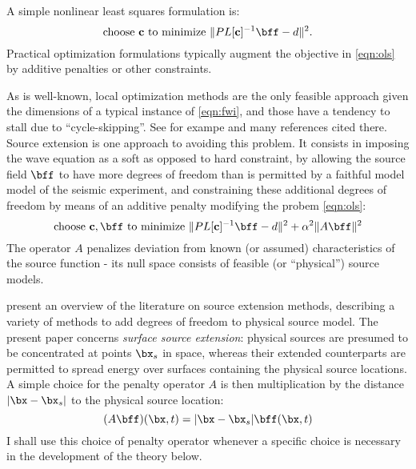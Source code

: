 A simple nonlinear least squares formulation is:
\begin{equation}
\label{eqn:ols}
\mbox{choose } {\bf c} \mbox{ to minimize } \|PL[{\bf c}]^{-1}\bff -d \|^2.
\end{equation}
Practical optimization formulations typically augment the objective in
\ref{eqn:ols} by additive penalties or other constraints.

As is well-known, local optimization methods are the only feasible
approach given the dimensions of a typical instance of \ref{eqn:fwi},
and those have a tendency to stall due to ``cycle-skipping''. See for
exampe \cite{VirieuxOperto:09} and many references cited there. Source
extension is one approach to avoiding this problem. It consists in
imposing the wave equation as a soft as opposed to hard constraint, by
allowing the source field $\bff$ to have more degrees of freedom than
is permitted by a faithful model model of the seismic experiment, and
constraining these additional degrees of freedom by means of an
additive penalty modifying the probem \ref{eqn:ols}:
\begin{equation}
\label{eqn:esi}
\mbox{choose } {\bf c}, \bff \mbox{ to minimize } \|PL[{\bf c}]^{-1}\bff -d \|^2 + \alpha^2 \|A\bff\|^2 
\end{equation}
The operator $A$ penalizes deviation from known (or assumed)
characteristics of the source function - its null space consists of
feasible (or ``physical'') source models.

\cite{HuangNammourSymesDollizal:SEG19} present an overview of the
literature on source extension methods, describing a variety of
methods to add degrees of freedom to physical source model. The present paper
concerns {\em surface source extension}: physical sources are
presumed to be concentrated at points $\bx_s$ in space, whereas their extended
counterparts are permitted to spread energy over surfaces containing
the physical source locations. A simple choice for the penalty
operator $A$ is then multiplication by the distance $|\bx-\bx_s|$ to the physical
source location:
\begin{equation}
  \label{eqn:penop}
  (A\bff)(\bx,t) = |\bx-\bx_s|\bff(\bx,t)
\end{equation}
I shall use this choice of penalty operator whenever a specific choice
is necessary in the development of the theory below.

